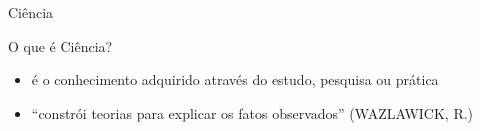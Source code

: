 \begin{frame}{Ciência}

\begin{block}{O que é Ciência?}
\begin{itemize}
    \item é o conhecimento adquirido através do estudo, pesquisa ou prática
    \item ``constrói teorias para explicar os fatos observados'' (WAZLAWICK, R.)
\end{itemize}
\end{block}

    
\end{frame}

